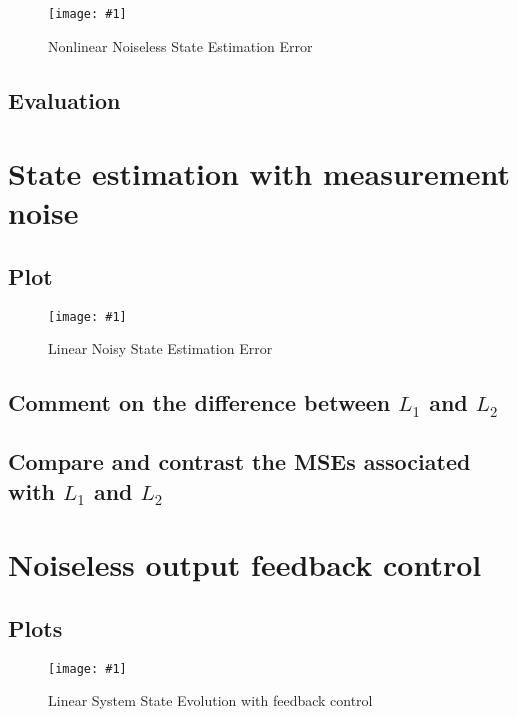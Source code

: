 \documentclass[10pt]{article}
\newcommand{\shrinkimage}[1]{\texttt{[image: \#1]}}
\begin{document}
\begin{figure}[b]
    \centering
    \shrinkimage{lab4/figs/nlin_noiseless_state_est_error.pdf}
    \caption{Nonlinear Noiseless State Estimation Error}
    \label{fig:nlin_noiseless_state_est_error}
\end{figure}

\subsection{Evaluation}

\section{State estimation with measurement noise}

\subsection{Plot}
\begin{figure}[b]
    \centering
    \shrinkimage{lin_noisy_state_est_error.pdf}
    \caption{Linear Noisy State Estimation Error}
    \label{fig:lin_noisy_state_est_error}
\end{figure}

\subsection{Comment on the difference between \texorpdfstring{$L_1$}{L1} and \texorpdfstring{$L_2$}{L2}}

\subsection{Compare and contrast the MSEs associated with \texorpdfstring{$L_1$}{L1} and \texorpdfstring{$L_2$}{L2}}

\section{Noiseless output feedback control} 

\subsection{Plots}
\begin{figure}[b]
    \centering
    \shrinkimage{lab4/figs/lin_noiseless_state_est_error_feedback.pdf}
    \caption{Linear System State Evolution with feedback control}
    \label{fig:lin_noiseless_state_est_error_feedback}
\end{figure}
\end{document}
